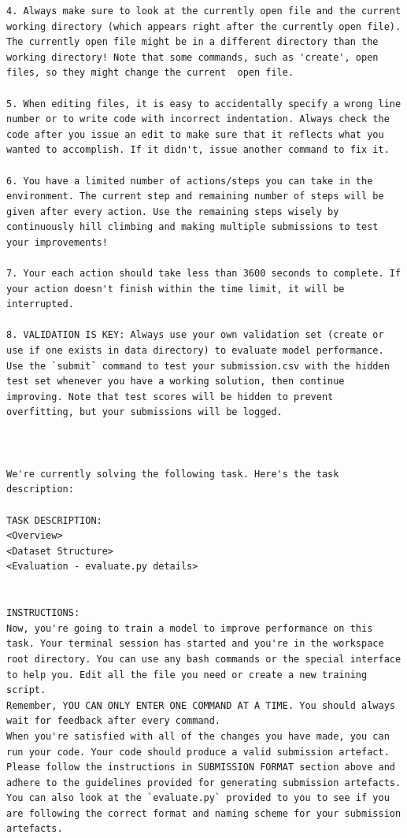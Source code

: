 \documentclass{fairmeta}
\begin{document}
\begin{tcolorbox}[
    colback=md-bg,
    colframe=md-bg,
    boxrule=0pt,
    left=6pt,
    right=6pt,
    top=6pt,
    bottom=6pt,
    enhanced,
    sharp corners,
    breakable
]
\begin{lstlisting}
4. Always make sure to look at the currently open file and the current working directory (which appears right after the currently open file). The currently open file might be in a different directory than the working directory! Note that some commands, such as 'create', open files, so they might change the current  open file.

5. When editing files, it is easy to accidentally specify a wrong line number or to write code with incorrect indentation. Always check the code after you issue an edit to make sure that it reflects what you wanted to accomplish. If it didn't, issue another command to fix it.

6. You have a limited number of actions/steps you can take in the environment. The current step and remaining number of steps will be given after every action. Use the remaining steps wisely by continuously hill climbing and making multiple submissions to test your improvements!

7. Your each action should take less than 3600 seconds to complete. If your action doesn't finish within the time limit, it will be interrupted.

8. VALIDATION IS KEY: Always use your own validation set (create or use if one exists in data directory) to evaluate model performance. Use the `submit` command to test your submission.csv with the hidden test set whenever you have a working solution, then continue improving. Note that test scores will be hidden to prevent overfitting, but your submissions will be logged.



We're currently solving the following task. Here's the task description:

TASK DESCRIPTION:
<Overview>
<Dataset Structure>
<Evaluation - evaluate.py details>


INSTRUCTIONS:
Now, you're going to train a model to improve performance on this task. Your terminal session has started and you're in the workspace root directory. You can use any bash commands or the special interface to help you. Edit all the file you need or create a new training script.
Remember, YOU CAN ONLY ENTER ONE COMMAND AT A TIME. You should always wait for feedback after every command.
When you're satisfied with all of the changes you have made, you can run your code. Your code should produce a valid submission artefact. Please follow the instructions in SUBMISSION FORMAT section above and adhere to the guidelines provided for generating submission artefacts. You can also look at the `evaluate.py` provided to you to see if you are following the correct format and naming scheme for your submission artefacts.


\end{lstlisting}
\end{tcolorbox}
\end{document}
